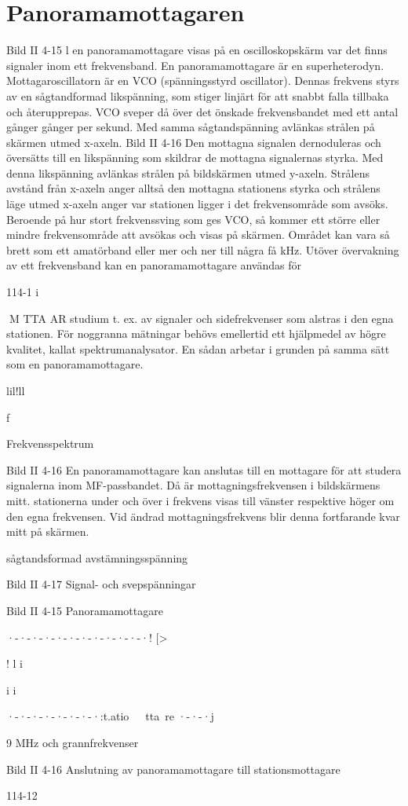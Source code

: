 \section{Panoramamottagaren}

Bild II 4-15
l en panoramamottagare visas på en oscilloskopskärm var det finns signaler inom ett
frekvensband. En panoramamottagare är
en superheterodyn. Mottagaroscillatorn är
en VCO (spänningsstyrd oscillator). Dennas frekvens styrs av en sågtandformad
likspänning, som stiger linjärt för att snabbt
falla tillbaka och återupprepas. VCO sveper
då över det önskade frekvensbandet med
ett antal gånger gånger per sekund. Med
samma sågtandspänning avlänkas strålen
på skärmen utmed x-axeln. Bild II 4-16
Den mottagna signalen dernoduleras och
översätts till en likspänning som skildrar de
mottagna signalernas styrka. Med denna
likspänning avlänkas strålen på bildskärmen utmed y-axeln. Strålens avstånd från
x-axeln anger alltså den mottagna stationens styrka och strålens läge utmed x-axeln
anger var stationen ligger i det frekvensområde som avsöks. Beroende på hur stort
frekvenssving som ges VCO, så kommer ett
större eller mindre frekvensområde att
avsökas och visas på skärmen. Området
kan vara så brett som ett amatörband eller
mer och ner till några få kHz.
Utöver övervakning av ett frekvensband
kan en panoramamottagare användas för

114-1 i

M TTA AR
studium t. ex. av signaler och sidefrekvenser
som alstras i den egna stationen. För noggranna mätningar behövs emellertid ett hjälpmedel av högre kvalitet, kallat spektrumanalysator. En sådan arbetar i grunden på
samma sätt som en panoramamottagare.

lil!ll

f

Frekvensspektrum

Bild II 4-16
En panoramamottagare kan anslutas till en
mottagare för att studera signalerna inom
MF-passbandet. Då är mottagningsfrekvensen i bildskärmens mitt. stationerna under
och över i frekvens visas till vänster respektive höger om den egna frekvensen.
Vid ändrad mottagningsfrekvens blir
denna fortfarande kvar mitt på skärmen.

sågtandsformad avstämningsspänning

Bild II 4-17 Signal- och svepspänningar

Bild II 4-15 Panoramamottagare

·-·-·-·-·-·-·-·-·-·-·-·!
[>

!
l
i

i
i

·-·-·-·-·-·-·-·:t.atio~~~tta~re ·-·-·j

9 MHz och
grannfrekvenser

Bild II 4-16 Anslutning av panoramamottagare till stationsmottagare

114-12

